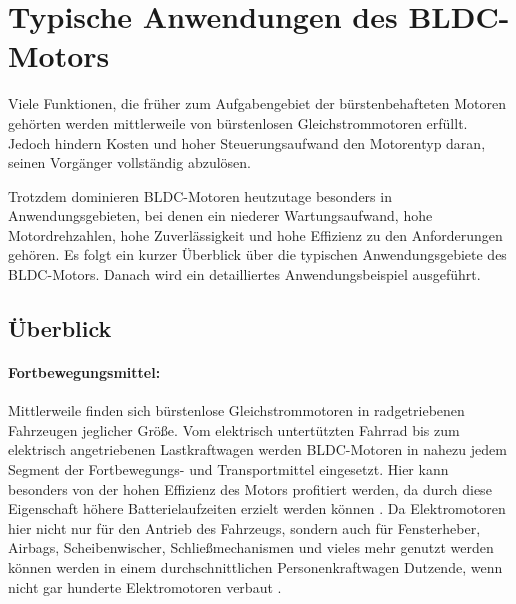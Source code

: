 \section{Typische Anwendungen des BLDC-Motors}

Viele Funktionen, die früher zum Aufgabengebiet der bürstenbehafteten Motoren gehörten werden mittlerweile von bürstenlosen Gleichstrommotoren erfüllt. Jedoch hindern Kosten und hoher Steuerungsaufwand den Motorentyp daran, seinen Vorgänger vollständig abzulösen.

Trotzdem dominieren BLDC-Motoren heutzutage besonders in Anwendungsgebieten, bei denen ein niederer Wartungsaufwand, hohe Motordrehzahlen, hohe Zuverlässigkeit und hohe Effizienz zu den Anforderungen gehören. Es folgt ein kurzer Überblick über die typischen Anwendungsgebiete des BLDC-Motors. Danach wird ein detailliertes Anwendungsbeispiel ausgeführt.

\subsection{Überblick}

\paragraph{Fortbewegungsmittel:} Mittlerweile finden sich bürstenlose Gleichstrommotoren in radgetriebenen Fahrzeugen jeglicher Größe. Vom elektrisch untertützten Fahrrad \parencite[vgl.][S.6]{Xia2012} bis zum elektrisch angetriebenen Lastkraftwagen werden BLDC-Motoren in nahezu jedem Segment der Fortbewegungs- und Transportmittel eingesetzt. Hier kann besonders von der hohen Effizienz des Motors profitiert werden, da durch diese Eigenschaft höhere Batterielaufzeiten erzielt werden können \parencite[vgl.][S.4]{Xia2012}. Da Elektromotoren hier nicht nur für den Antrieb des Fahrzeugs, sondern auch für Fensterheber, Airbags, Scheibenwischer, Schließmechanismen und vieles mehr genutzt werden können werden in einem durchschnittlichen Personenkraftwagen Dutzende, wenn nicht gar hunderte Elektromotoren verbaut \parencite[vgl.][S.4]{Xia2012}.

